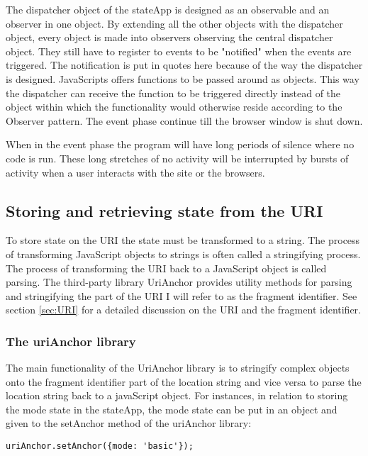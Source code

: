\documentclass[english]{ifimaster}
\begin{document}
The dispatcher object of the stateApp is designed as an observable and an observer in one object. By extending all the other objects with the dispatcher object, every object is made into observers observing the central dispatcher object. They still have to register to events to be "notified" when the events are triggered. The notification is put in quotes here because of the way the dispatcher is designed. JavaScripts offers functions to be passed around as objects. This way the dispatcher can receive the function to be triggered directly instead of the object within which the functionality would otherwise reside according to the Observer pattern. The event phase continue till the browser window is shut down. 

When in the event phase the program will have long periods of silence where no code is run. These long stretches of no activity will be interrupted by bursts of activity when a user interacts with the site or the browsers.


\subsection{Storing and retrieving state from the URI}
To store state on the URI the state must be transformed to a string. The process of transforming JavaScript objects to strings is often called a stringifying process. The process of transforming the URI back to a JavaScript object is called parsing. The third-party library UriAnchor provides utility methods for parsing and stringifying the part of the URI I will refer to as the fragment identifier. See section \ref{sec:URI} for a detailed discussion on the URI and the fragment identifier. 


\subsubsection{The uriAnchor library}
The main functionality of the UriAnchor library is to stringify complex 
objects onto the fragment identifier part of the location string and vice versa to parse the location string back to a javaScript object. For instances, in relation to storing the mode state in the stateApp, the mode state can be put in an object and given to the setAnchor method of the uriAnchor library:
\label{sec:results_uriAnchor}
\begin{lstlisting}[caption=Setting the location with the Uri Anchor library]
  uriAnchor.setAnchor({mode: 'basic'}); 
\end{lstlisting}
\end{document}
